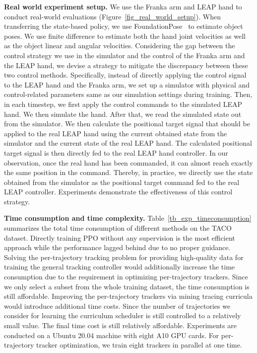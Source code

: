 \noindent\textbf{Real world experiment setup.} 
We use the Franka arm and LEAP hand to conduct real-world evaluations (Figure~\ref{fig_real_world_setup}). When transferring the state-based policy, we use FoundationPose~\cite{Wen2023FoundationPoseU6} to estimate object poses. We use finite difference to estimate both the hand joint velocities as well as the object linear and angular velocities. Considering the gap between the control strategy we use in the simulator and the control of the Franka arm and the LEAP hand, we devise a strategy to mitigate the discrepancy between these two control methods. Specifically, instead of directly applying the control signal to the LEAP hand and the Franka arm, we set up a simulator with physical and control-related parameters same as our simulation settings during training. Then, in each timestep, we first apply the control commands to the simulated LEAP hand. We then simulate the hand. After that, we read the simulated state out from the simulator. We then calculate the positional target signal that should be applied to the real LEAP hand using the current obtained state from the simulator and the current state of the real LEAP hand. The calculated positional target signal is then directly fed to the real LEAP hand controller. In our observation, once the real hand has been commanded, it can almost reach exactly the same position in the command. Thereby, in practice, we directly use the state obtained from the simulator as the positional target command fed to the real LEAP controller. Experiments demonstrate the effectiveness of this control strategy. 



\noindent\textbf{Time consumption and time complexity.} Table~\ref{tb_exp_timeconsumption} summarizes the total time consumption of different methods on the TACO dataset. Directly training PPO without any supervision is the most efficient approach while the performance lagged behind due to no proper guidance. Solving the per-trajectory tracking problem for providing high-quality data for training the general tracking controller would additionally increase the time consumption due to the requirement in optimizing per-trajectory trackers. Since we only select a subset from the whole training dataset, the time consumption is still affordable. Improving the per-trajectory trackers via mining tracing curricula would introduce additional time costs. Since the number of trajectories we consider for learning the curriculum scheduler is still controlled to a relatively small value. The final time cost is still relatively affordable. Experiments are conducted on a Ubuntu 20.04 machine with eight A10 GPU cards. For per-trajectory tracker optimization, we train eight trackers in parallel at one time. 

